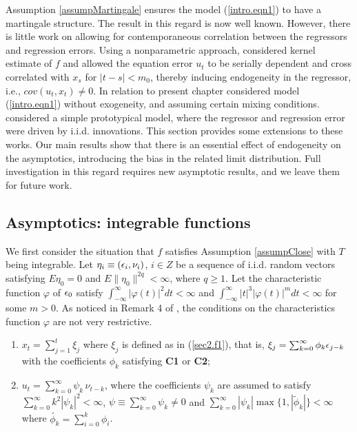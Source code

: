 Assumption \ref{assumpMartingale} ensures the model (\ref {intro.eqn1}) to have a martingale structure.
The result in this regard is now well known. However, there is little work
on allowing for contemporaneous correlation between the regressors and regression errors.
Using a nonparametric approach, \cite{wangphillips2009} considered kernel estimate of $f$ and allowed the equation error $u_t$ to be serially dependent and cross correlated with $x_s$ for $|t-s|<m_0$, thereby inducing endogeneity in the regressor, i.e., $cov (u_t, x_t)\not=0$. In relation to present chapter \cite{dejong2002} considered model (\ref{intro.eqn1}) without exogeneity, and assuming certain mixing conditions. \cite{changpark2010} considered a simple prototypical model, where the regressor and regression error were driven by i.i.d. innovations. This section  provides some  extensions to these works. Our main results  show that there is an essential effect of endogeneity on the asymptotics,  introducing the bias in the related limit distribution. Full investigation in this regard requires new asymptotic results, and we leave them for future work.


\subsection{Asymptotics: integrable functions} 

We first consider the situation that $f$ satisfies Assumption \ref{assumpClose} with $T$
being integrable.  Let $\eta_i\equiv (\epsilon_i, \nu_i)$, $i\in Z$ be a sequence of i.i.d. random vectors satisfying $E\eta_0=0$ and $E\|\eta_0\|^{2q}<\infty$,
 where $q \ge 1$. Let the characteristic function $\varphi$ of $\epsilon_0$ satisfy $\int_{-\infty}^{\infty} | \varphi(t)|^2 dt < \infty$ and $\int_{-\infty}^{\infty} |t|^3 |\varphi(t)|^m dt < \infty$ for some $m > 0$. As noticed in Remark 4 of \cite{jaganathan2008}, the conditions on the characteristics function $\varphi$ are not very restrictive.



\begin{assump}
\begin{enumerate}[label=(\roman{*}), leftmargin=*, widest=0] \itemsep0pt \parskip0pt 
\item $x_t=\sum_{j=1}^t\xi_j$ where $\xi_j$ is defined as in (\ref {sec2.f1}), that is, $\xi_j=\sum_{k=0}^{\infty}\phi_k\epsilon_{j-k}$ with the coefficients $\phi_k$ satisfying {\bf C1} or {\bf C2};

\item $u_t= \sum_{k=0}^{\infty}\psi_k\, \nu_{t-k}$, where the coefficients $\psi_k$ are assumed to satisfy  $\sum_{k=0}^{\infty}k^2 |\psi_k|^2<\infty$, $ \psi \equiv \sum_{k=0}^{\infty}\psi_k\not= 0$ and $\sum_{k=0}^{\infty} |\psi_k| \max\{1, |\tilde{\phi}_k|\}< \infty$ where $\tilde{\phi_k} = \sum_{i = 0}^k \phi_i$.
\end{enumerate}
\end{assump}


